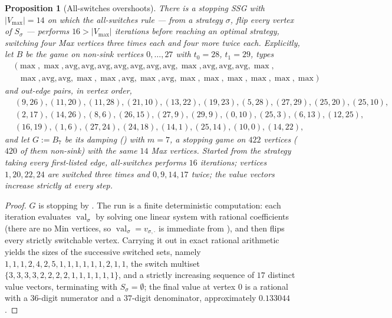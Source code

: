 \documentclass[11pt]{article}
\theoremstyle{plain}
\newtheorem{proposition}[theorem]{Proposition}
\theoremstyle{definition}
\DeclareMathOperator{\val}{val}
\newcommand{\Vmax}{V_{\max}}
\begin{document}
\begin{proposition}[All-switches overshoots]\label{prop:allswitch-overshoot}
There is a stopping SSG with $|\Vmax|=14$ on which the all-switches rule
--- from a strategy $\sigma$, flip \emph{every} vertex of $S_\sigma$ ---
performs $16>|\Vmax|$ iterations before reaching an optimal strategy,
switching four Max vertices three times each and four more twice each.
Explicitly, let $B$ be the game on non-sink vertices $0,\dots,27$ with
$t_0=28$, $t_1=29$, types
\[
\begin{aligned}
 &(\max,\max,\mathrm{avg},\mathrm{avg},\mathrm{avg},\mathrm{avg},\mathrm{avg},\mathrm{avg},\mathrm{avg},\max,\mathrm{avg},\mathrm{avg},\mathrm{avg},\max,\\
 &\ \ \max,\mathrm{avg},\mathrm{avg},\max,\max,\mathrm{avg},\max,\mathrm{avg},\max,\max,\max,\max,\max,\max)
\end{aligned}
\]
and out-edge pairs, in vertex order,
\[
\begin{aligned}
 &(9,26),(11,20),(11,28),(21,10),(13,22),(19,23),(5,28),(27,29),(25,20),(25,10),\\
 &(2,17),(14,26),(8,6),(26,15),(27,9),(29,9),(0,10),(25,3),(6,13),(12,25),\\
 &(16,19),(1,6),(27,24),(24,18),(14,1),(25,14),(10,0),(14,22),
\end{aligned}
\]
and let $G:=B_7$ be its damping () with $m=7$, a
stopping game on $422$ vertices ($420$ of them non-sink) with the same
$14$ Max vertices. Started
from the strategy taking every first-listed edge, all-switches performs
$16$ iterations; vertices $1,20,22,24$ are switched three times and
$0,9,14,17$ twice; the value vectors increase strictly at every step.
\end{proposition}

\begin{proof}
$G$ is stopping by . The run is a finite deterministic
computation: each iteration evaluates $\val_{\sigma}$ by solving one
linear system with rational coefficients (there are no Min vertices, so
$\val_\sigma=v_{\sigma,\cdot}$ is immediate from ), and
then flips every strictly switchable vertex. Carrying it out in exact
rational arithmetic yields the sizes of the successive switched sets,
namely $1,1,1,2,4,2,5,1,1,1,1,1,1,2,1,1$, the switch multiset
$\{3,3,3,3,2,2,2,2,1,1,1,1,1,1\}$, and a strictly increasing sequence of
$17$ distinct value vectors, terminating with $S_\sigma=\emptyset$; the
final value at vertex $0$ is a rational with a $36$-digit numerator and a
$37$-digit denominator, approximately $0.133044$.
\end{proof}
\end{document}
